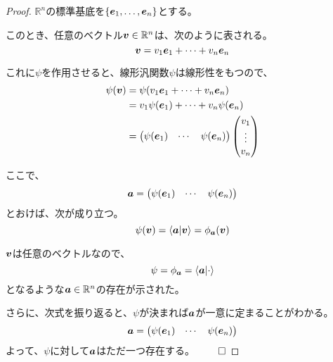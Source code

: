 \documentclass[../../../topic_linear-algebra]{subfiles}
\begin{document}
\begin{proof}
  $\mathbb{R}^n$の標準基底を$\{\vb*{e}_1, \ldots, \vb*{e}_n\}$とする。
  
  このとき、任意のベクトル$\vb*{v} \in \mathbb{R}^n$は、次のように表される。
  \begin{equation*}
    \vb*{v} = v_1 \vb*{e}_1 + \cdots + v_n \vb*{e}_n
  \end{equation*}
  
  これに$\psi$を作用させると、線形汎関数$\psi$は線形性をもつので、
  \begin{align*}
    \psi(\vb*{v}) &= \psi(v_1 \vb*{e}_1 + \cdots + v_n \vb*{e}_n) \\
    &= v_1 \psi(\vb*{e}_1) + \cdots + v_n \psi(\vb*{e}_n) \\
    &= \begin{pmatrix}
      \psi(\vb*{e}_1) & \cdots & \psi(\vb*{e}_n)
    \end{pmatrix} \begin{pmatrix}
      v_1 \\
      \vdots \\
      v_n
    \end{pmatrix}
  \end{align*}
  
  ここで、
  \begin{equation*}
    \vb*{a} = \begin{pmatrix}
      \psi(\vb*{e}_1) & \cdots & \psi(\vb*{e}_n)
    \end{pmatrix}
  \end{equation*}
  とおけば、次が成り立つ。
  \begin{equation*}
    \psi(\vb*{v}) = \braket{\vb*{a}|\vb*{v}} = \phi_{\vb*{a}}(\vb*{v})
  \end{equation*}
  
  $\vb*{v}$は任意のベクトルなので、
  \begin{equation*}
    \psi = \phi_{\vb*{a}} = \braket{\vb*{a}|\cdot}
  \end{equation*}
  となるような$\vb*{a} \in \mathbb{R}^n$の存在が示された。
  
  \br
  
  さらに、次式を振り返ると、$\psi$が決まれば$\vb*{a}$が一意に定まることがわかる。
  \begin{equation*}
    \vb*{a} = \begin{pmatrix}
      \psi(\vb*{e}_1) & \cdots & \psi(\vb*{e}_n)
    \end{pmatrix}
  \end{equation*}
  よって、$\psi$に対して$\vb*{a}$はただ一つ存在する。 $\qed$
\end{proof}
\end{document}
